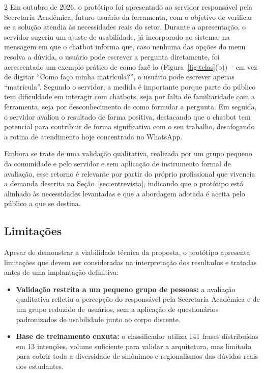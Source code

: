 \documentclass[10pt]{article}
\begin{document}
\begin{multicols}{2}
Em outubro de 2026, o protótipo foi apresentado ao servidor responsável
pela Secretaria Acadêmica, futuro usuário da ferramenta, com o objetivo
de verificar se a solução atendia às necessidades reais do setor. Durante
a apresentação, o servidor sugeriu um ajuste de usabilidade, já
incorporado ao sistema: na mensagem em que o chatbot informa que, caso
nenhuma das opções do menu resolva a dúvida, o usuário pode escrever a
pergunta diretamente, foi acrescentado um exemplo prático de como fazê-lo (Figura~\ref{fig:telas}(b))
-- em vez de digitar ``Como faço minha matrícula?'', o usuário pode
escrever apenas ``matrícula''. Segundo o servidor, a medida é importante
porque parte do público tem dificuldade em interagir com chatbots, seja
por falta de familiaridade com a ferramenta, seja por desconhecimento de
como formular a pergunta. Em seguida, o servidor avaliou o resultado de
forma positiva, destacando que o chatbot tem potencial para contribuir de
forma significativa com o seu trabalho, desafogando a rotina de
atendimento hoje concentrada no WhatsApp.

Embora se trate de uma validação qualitativa, realizada por um grupo pequeno da comunidade e pelo servidor e sem aplicação de instrumento formal de avaliação, esse retorno
é relevante por partir do próprio profissional que vivencia a demanda
descrita na Seção~\ref{sec:entrevista}, indicando que o protótipo está alinhado às
necessidades levantadas e que a abordagem adotada é aceita pelo público
a que se destina. 
\subsection{Limitações}

Apesar de demonstrar a viabilidade técnica da proposta, o protótipo
apresenta limitações que devem ser consideradas na interpretação dos
resultados e tratadas antes de uma implantação definitiva:

\begin{itemize}
  \item \textbf{Validação restrita a um pequeno grupo de pessoas:} a avaliação
  qualitativa refletiu a percepção do responsável pela Secretaria Acadêmica
  e de um grupo reduzido de usuários, sem a aplicação de questionários
  padronizados de usabilidade junto ao corpo discente.

  \item \textbf{Base de treinamento enxuta:} o classificador utiliza 141
  frases distribuídas em 13 intenções, volume suficiente para validar a
  arquitetura, mas limitado para cobrir toda a diversidade de sinônimos e
  regionalismos das dúvidas reais dos estudantes.


\end{itemize}
\end{multicols}
\end{document}
